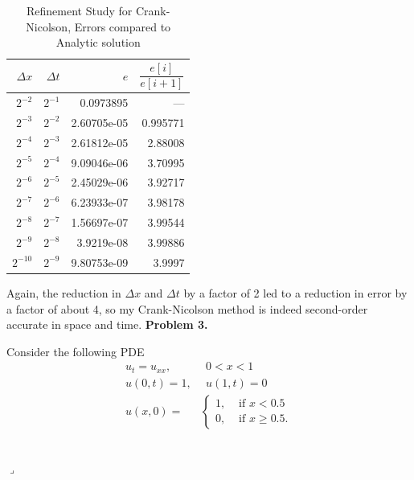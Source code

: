 \documentclass[12pt]{article}
\newenvironment{myprob}[1]
    {%
    \noindent{\Huge$\ulcorner$}\textbf{#1.}\begin{em}
    }
    { 
    \end{em} \\ \hphantom{l} \hfill {\Huge$\lrcorner$} }
\begin{document}
\begin{table}[H]
\caption{Refinement Study for Crank-Nicolson, Errors compared to Analytic solution}
\centering \begin{tabular}{||r|r|r|r||}
\hline \hline
     $\Delta x$ &    $\Delta t$ &    $e$ &   $\dfrac{e[i]}{e[i+1]}$ \\
\hline 
$2^{-2}$  & $2^{-1}$  & 0.0973895   &    ---    \\
 $2^{-3}$  & $2^{-2}$    & 2.60705e-05 &      0.995771 \\
  $2^{-4}$  & $2^{-3}$     & 2.61812e-05 &      2.88008  \\
  $2^{-5}$  & $2^{-4}$   & 9.09046e-06 &      3.70995  \\
  $2^{-6}$  & $2^{-5}$ & 2.45029e-06 &      3.92717  \\
  $2^{-7}$  & $2^{-6}$ & 6.23933e-07 &      3.98178  \\
  $2^{-8}$  & $2^{-7}$ & 1.56697e-07 &      3.99544  \\
  $2^{-9}$  & $2^{-8}$ & 3.9219e-08  &      3.99886  \\
  $2^{-10}$  & $2^{-9}$ & 9.80753e-09 &      3.9997   \\
\hline \hline
\end{tabular}
\end{table}
Again, the reduction in $\Delta x$ and $\Delta t$ by a factor of 2 led to a reduction in error by a factor of about 4, so my Crank-Nicolson method is indeed second-order accurate in space and time.
\newpage
\begin{myprob}{Problem 3}
Consider the following PDE
\begin{align*}
u_t = u_{xx},& \ \ 0<x<1 \\
u(0,t)=1,& \ \ u(1,t)=0 \\
u(x,0) = &\begin{cases} 1, &\text{ if } x< 0.5 \\
0, &\text{ if } x\geq0.5.
\end{cases}
\end{align*}
\end{myprob}
\end{document}
